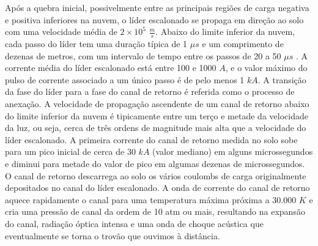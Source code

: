 \documentclass[a4paper, 12pt, onecolumn,singlespacing]{article}
\begin{document}
	Após a quebra inicial, possivelmente entre as principais regiões de carga negativa e positiva inferiores na nuvem, o líder escalonado se propaga em direção ao solo com uma velocidade média de $2 \times 10^{5}$ $\frac{m}{s}$. Abaixo do limite inferior da nuvem, cada passo do líder tem uma duração típica de 1 $\mu s$ e um comprimento de dezenas de metros, com um intervalo de tempo entre os passos de 20 a 50 $\mu s$ . A corrente média do líder escalonado está entre 100 e 1000 $A$, e o valor máximo do pulso de corrente associado a um único passo é de pelo menos 1 $kA$. A transição da fase do líder para a fase do canal de retorno é referida como o processo de anexação. A velocidade de propagação ascendente de um canal de retorno abaixo do limite inferior da nuvem é tipicamente entre um terço e metade da velocidade da luz, ou seja, cerca de três ordens de magnitude mais alta que a velocidade do líder escalonado. A primeira corrente do canal de retorno medida no solo sobe para um pico inicial de cerca de 30 $kA$ (valor mediano) em alguns microssegundos e diminui para metade do valor de pico em algumas dezenas de microssegundos. O canal de retorno descarrega ao solo os vários coulombs de carga originalmente depositados no canal do líder escalonado. A onda de corrente do canal de retorno aquece rapidamente o canal para uma temperatura máxima próxima a 30.000 $K$ e cria uma pressão de canal da ordem de 10 atm ou mais, resultando na expansão do canal, radiação óptica intensa e uma onda de choque acústica que eventualmente se torna o trovão que ouvimos à distância.
	
\end{document}
